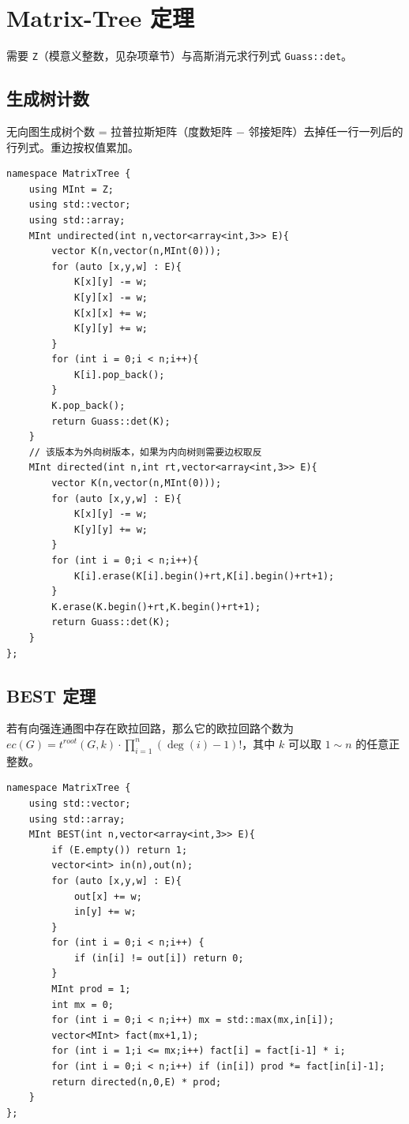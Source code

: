\section{Matrix-Tree 定理}

需要 \texttt{Z}（模意义整数，见杂项章节）与高斯消元求行列式 \texttt{Guass::det}。

\subsection{生成树计数}

无向图生成树个数 = 拉普拉斯矩阵（度数矩阵 $-$ 邻接矩阵）去掉任一行一列后的行列式。重边按权值累加。

\begin{lstlisting}
namespace MatrixTree {
    using MInt = Z;
    using std::vector;
    using std::array;
    MInt undirected(int n,vector<array<int,3>> E){
        vector K(n,vector(n,MInt(0)));
        for (auto [x,y,w] : E){
            K[x][y] -= w;
            K[y][x] -= w;
            K[x][x] += w;
            K[y][y] += w;
        }
        for (int i = 0;i < n;i++){
            K[i].pop_back();
        }
        K.pop_back();
        return Guass::det(K);
    }
    // 该版本为外向树版本，如果为内向树则需要边权取反
    MInt directed(int n,int rt,vector<array<int,3>> E){
        vector K(n,vector(n,MInt(0)));
        for (auto [x,y,w] : E){
            K[x][y] -= w;
            K[y][y] += w;
        }
        for (int i = 0;i < n;i++){
            K[i].erase(K[i].begin()+rt,K[i].begin()+rt+1);
        }
        K.erase(K.begin()+rt,K.begin()+rt+1);
        return Guass::det(K);
    }
};
\end{lstlisting}

\subsection{BEST 定理}

若有向强连通图中存在欧拉回路，那么它的欧拉回路个数为 $ec(G)=t^{root}(G,k)\cdot\prod_{i=1}^n(\deg(i)-1)!$，其中 $k$ 可以取 $1\sim n$ 的任意正整数。

\begin{lstlisting}
namespace MatrixTree {
    using std::vector;
    using std::array;
    MInt BEST(int n,vector<array<int,3>> E){
        if (E.empty()) return 1;
        vector<int> in(n),out(n);
        for (auto [x,y,w] : E){
            out[x] += w;
            in[y] += w;
        }
        for (int i = 0;i < n;i++) {
            if (in[i] != out[i]) return 0;
        }
        MInt prod = 1;
        int mx = 0;
        for (int i = 0;i < n;i++) mx = std::max(mx,in[i]);
        vector<MInt> fact(mx+1,1);
        for (int i = 1;i <= mx;i++) fact[i] = fact[i-1] * i;
        for (int i = 0;i < n;i++) if (in[i]) prod *= fact[in[i]-1];
        return directed(n,0,E) * prod;
    }
};
\end{lstlisting}

